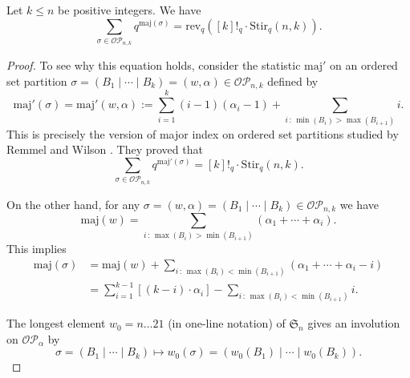 \documentclass[ALCO,ThmDefs,published]{cedram}
\newcommand{\symm}{{\mathfrak{S}}}
\theoremstyle{plain}
\newcommand{\maj}{{\mathrm {maj}}}
\newcommand{\Stir}{{\mathrm {Stir}}}
\newcommand{\rev}{{\mathrm {rev}}}
\newcommand{\symm}{{\mathfrak{S}}}
\newcommand{\OP}{{\mathcal{OP}}}
\begin{document}
\begin{proposition}
Let $k \leq n$ be positive integers.  We have
\begin{equation}
\sum_{\sigma \in \OP_{n,k}} q^{\maj(\sigma)} = \rev_q( [k]!_q \cdot \Stir_q(n,k)).
\end{equation}
\end{proposition}

\begin{proof}
To see why this equation holds, consider the statistic $\maj'$ on an ordered set partition 
$\sigma = (B_1 \mid \cdots \mid B_k) = (w, \alpha) \in \OP_{n,k}$ defined by
\begin{equation}
\maj'(\sigma) = \maj'(w,\alpha) := \sum_{i = 1}^k (i-1)(\alpha_i - 1) + \sum_{i \, : \, \min(B_i) > \max(B_{i+1})} i.
\end{equation}
This is precisely the version of major index on ordered set partitions studied
by Remmel and Wilson \cite{RW}.  They proved \cite[Eqn. 15, Prop. 5.1.1]{RW}
that
\begin{equation}
\label{remmel-wilson}
\sum_{\sigma \in \OP_{n,k}} q^{\maj'(\sigma)} = [k]!_q \cdot \Stir_q(n,k).
\end{equation}

On the other hand, for any $\sigma = (w,\alpha) = (B_1 \mid \cdots \mid B_k) \in \OP_{n,k}$ we have
\begin{equation}
\maj(w) = \sum_{i \, : \, \max(B_i) > \min(B_{i+1})} (\alpha_1 + \cdots + \alpha_i).
\end{equation}
This implies
\begin{align}
\maj(\sigma) &= \maj(w) + \sum_{i \, : \, \max(B_i) < \min(B_{i+1})} (\alpha_1 + \cdots + \alpha_i - i) \\
&= \sum_{i = 1}^{k-1} [(k-i) \cdot \alpha_i]   - \sum_{i \, : \, \max(B_i) < \min(B_{i+1})} i.
\end{align}

The longest element $w_0 =  n \dots 21$ (in one-line notation) of $\symm_n$ gives an involution on $\OP_\alpha$ by
\begin{equation*}
\sigma = (B_1 \mid \cdots \mid B_k) \mapsto w_0(\sigma) = (w_0(B_1) \mid \cdots \mid w_0(B_k)).
\end{equation*}




\end{proof}
\end{document}
